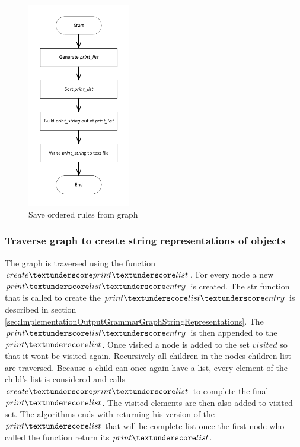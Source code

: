 \begin{figure}[H]
\centering
\includegraphics[width=0.4\textwidth]{images/Implementation_saveorderedrules.pdf}
\caption{Save ordered rules from graph}
\label{fig:ImplementationOutputSaveOrderedRules}
\end{figure}


\subsubsection{Traverse graph to create string representations of objects}\label{sec:ImpolementationOutputGrammarGraphTraverse}

The graph is traversed using the function $create\textunderscore print\textunderscore list$. For every node a new $print\textunderscore list\textunderscore entry$ is created. The str function that is called to create the $print\textunderscore list\textunderscore entry$ is described in section \ref{sec:ImplementationOutputGrammarGraphStringRepresentations}. 
The $print\textunderscore list\textunderscore entry$ is then appended to the $print\textunderscore list$. Once visited a node is added to the set $visited$ so that it wont be visited again.
Recursively all children in the nodes children list are traversed. Because a child can once again have a list, every element of the child's list is considered and calls $create\textunderscore print\textunderscore list$ to complete the final $print\textunderscore list$. The visited elements are then also added to visited set. The algorithms ends with returning his version of the $print\textunderscore list$ that will be complete list once the first node who called the function return its $print\textunderscore list$.

